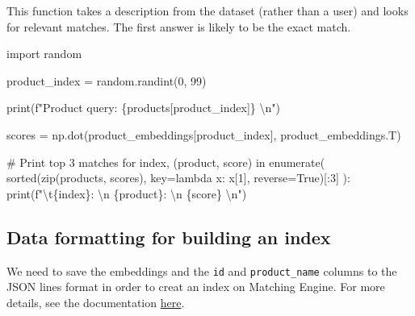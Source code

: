\documentclass[
  letterpaper,
  DIV=11,
  numbers=noendperiod]{scrreprt}
\newenvironment{Shaded}{\begin{snugshade}}{\end{snugshade}}
\newcommand{\BuiltInTok}[1]{\textcolor[rgb]{0.00,0.23,0.31}{#1}}
\newcommand{\CharTok}[1]{\textcolor[rgb]{0.13,0.47,0.30}{#1}}
\newcommand{\CommentTok}[1]{\textcolor[rgb]{0.37,0.37,0.37}{#1}}
\newcommand{\ControlFlowTok}[1]{\textcolor[rgb]{0.00,0.23,0.31}{#1}}
\newcommand{\DecValTok}[1]{\textcolor[rgb]{0.68,0.00,0.00}{#1}}
\newcommand{\ImportTok}[1]{\textcolor[rgb]{0.00,0.46,0.62}{#1}}
\newcommand{\KeywordTok}[1]{\textcolor[rgb]{0.00,0.23,0.31}{#1}}
\newcommand{\NormalTok}[1]{\textcolor[rgb]{0.00,0.23,0.31}{#1}}
\newcommand{\OperatorTok}[1]{\textcolor[rgb]{0.37,0.37,0.37}{#1}}
\newcommand{\SpecialCharTok}[1]{\textcolor[rgb]{0.37,0.37,0.37}{#1}}
\newcommand{\SpecialStringTok}[1]{\textcolor[rgb]{0.13,0.47,0.30}{#1}}
\newcommand{\VariableTok}[1]{\textcolor[rgb]{0.07,0.07,0.07}{#1}}
\begin{document}
This function takes a description from the dataset (rather than a user)
and looks for relevant matches. The first answer is likely to be the
exact match.

\begin{Shaded}
\begin{Highlighting}[]
\ImportTok{import}\NormalTok{ random}

\NormalTok{product\_index }\OperatorTok{=}\NormalTok{ random.randint(}\DecValTok{0}\NormalTok{, }\DecValTok{99}\NormalTok{)}

\BuiltInTok{print}\NormalTok{(}\SpecialStringTok{f"Product query: }\SpecialCharTok{\{}\NormalTok{products[product\_index]}\SpecialCharTok{\}}\SpecialStringTok{ }\CharTok{\textbackslash{}n}\SpecialStringTok{"}\NormalTok{)}

\NormalTok{scores }\OperatorTok{=}\NormalTok{ np.dot(product\_embeddings[product\_index], product\_embeddings.T)}

\CommentTok{\# Print top 3 matches}
\ControlFlowTok{for}\NormalTok{ index, (product, score) }\KeywordTok{in} \BuiltInTok{enumerate}\NormalTok{(}
    \BuiltInTok{sorted}\NormalTok{(}\BuiltInTok{zip}\NormalTok{(products, scores), key}\OperatorTok{=}\KeywordTok{lambda}\NormalTok{ x: x[}\DecValTok{1}\NormalTok{], reverse}\OperatorTok{=}\VariableTok{True}\NormalTok{)[:}\DecValTok{3}\NormalTok{]}
\NormalTok{):}
    \BuiltInTok{print}\NormalTok{(}\SpecialStringTok{f"}\CharTok{\textbackslash{}t}\SpecialCharTok{\{}\NormalTok{index}\SpecialCharTok{\}}\SpecialStringTok{: }\CharTok{\textbackslash{}n}\SpecialStringTok{ }\SpecialCharTok{\{}\NormalTok{product}\SpecialCharTok{\}}\SpecialStringTok{: }\CharTok{\textbackslash{}n}\SpecialStringTok{ }\SpecialCharTok{\{}\NormalTok{score}\SpecialCharTok{\}}\SpecialStringTok{ }\CharTok{\textbackslash{}n}\SpecialStringTok{"}\NormalTok{)}
\end{Highlighting}
\end{Shaded}

\hypertarget{data-formatting-for-building-an-index}{%
\subsection{Data formatting for building an
index}\label{data-formatting-for-building-an-index}}

We need to save the embeddings and the \texttt{id} and
\texttt{product\_name} columns to the JSON lines format in order to
creat an index on Matching Engine. For more details, see the
documentation
\href{https://cloud.google.com/vertex-ai/docs/matching-engine/match-eng-setup/format-structure}{here}.
\end{document}
